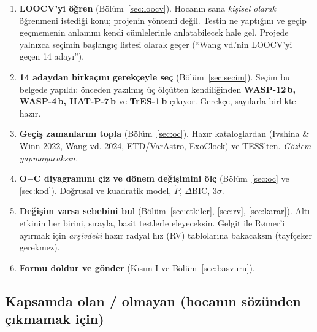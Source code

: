 \documentclass[11pt,a4paper]{article}
\begin{document}
\begin{enumerate}[label=\textbf{Adım \arabic*:},leftmargin=*]
  \item \textbf{LOOCV'yi öğren} (Bölüm~\ref{sec:loocv}). Hocanın sana \emph{kişisel olarak} öğrenmeni istediği konu;
        projenin yöntemi değil. Testin ne yaptığını ve geçip geçmemenin anlamını kendi cümlelerinle anlatabilecek hale gel.
        Projede yalnızca seçimin başlangıç listesi olarak geçer (“Wang vd.'nin LOOCV'yi geçen 14 adayı”).
  \item \textbf{14 adaydan birkaçını gerekçeyle seç} (Bölüm~\ref{sec:secim}). Seçim bu belgede yapıldı:
        önceden yazılmış üç ölçütten kendiliğinden \textbf{WASP-12\,b, WASP-4\,b, HAT-P-7\,b} ve \textbf{TrES-1\,b}
        çıkıyor. Gerekçe, sayılarla birlikte hazır.
  \item \textbf{Geçiş zamanlarını topla} (Bölüm~\ref{sec:oc}). Hazır kataloglardan (Ivshina \& Winn 2022,
        Wang vd. 2024, ETD/VarAstro, ExoClock) ve TESS'ten. \emph{Gözlem yapmayacaksın.}
  \item \textbf{O$-$C diyagramını çiz ve dönem değişimini ölç} (Bölüm~\ref{sec:oc} ve \ref{sec:kod}).
        Doğrusal ve kuadratik model, $\dot P$, $\Delta$BIC, 3$\sigma$.
  \item \textbf{Değişim varsa sebebini bul} (Bölüm~\ref{sec:etkiler}, \ref{sec:rv}, \ref{sec:karar}).
        Altı etkinin her birini, sırayla, basit testlerle eleyeceksin. Gelgit ile Rømer'i ayırmak için
        \emph{arşivdeki} hazır radyal hız (RV) tablolarına bakacaksın (tayfçeker gerekmez).
  \item \textbf{Formu doldur ve gönder} (Kısım I ve Bölüm~\ref{sec:basvuru}).
\end{enumerate}

\subsection{Kapsamda olan / olmayan (hocanın sözünden çıkmamak için)}
\end{document}
